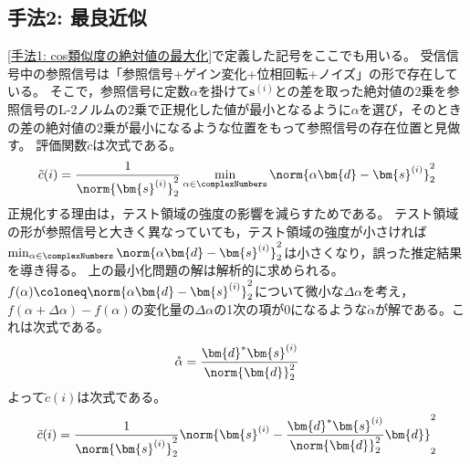         \subsection{手法2: 最良近似}
            \ref{手法1: cos類似度の絶対値の最大化}で定義した記号をここでも用いる。
            受信信号中の参照信号は「参照信号+ゲイン変化+位相回転+ノイズ」の形で存在している。
            そこで，参照信号に定数$\alpha$を掛けて$\bm{s}^{(i)}$との差を取った絶対値の2乗を参照信号のL-2ノルムの2乗で正規化した値が最小となるように$\alpha$を選び，そのときの差の絶対値の2乗が最小になるような位置をもって参照信号の存在位置と見做す。
            評価関数$\tilde{c}$は次式である。
            \[ \tilde{c}(i) = \frac{1}{\norm{\bm{s}^{(i)}}_2^2}\min_{\alpha \in \complexNumbers}\norm{\alpha\bm{d} - \bm{s}^{(i)}}_2^2 \]
            正規化する理由は，テスト領域の強度の影響を減らすためである。
            テスト領域の形が参照信号と大きく異なっていても，テスト領域の強度が小さければ$\min_{\alpha \in \complexNumbers}\norm{\alpha\bm{d} - \bm{s}^{(i)}}_2^2$は小さくなり，誤った推定結果を導き得る。
            上の最小化問題の解は解析的に求められる。
            $f(\alpha) \coloneq \norm{\alpha\bm{d} - \bm{s}^{(i)}}_2^2$について微小な$\Delta\alpha$を考え，$f(\alpha+\Delta\alpha) - f(\alpha)$の変化量の$\Delta\alpha$の1次の項が0になるような$\mathring{\alpha}$が解である。これは次式である。
            \[
                \mathring{\alpha} = \frac{\bm{d}^*\bm{s}^{(i)}}{\norm{\bm{d}}_2^2}
            \]
            よって$\tilde{c}(i)$は次式である。
            \[ \tilde{c}(i) = \frac{1}{\norm{\bm{s}^{(i)}}_2^2}\norm{\bm{s}^{(i)} - \frac{\bm{d}^*\bm{s}^{(i)}}{\norm{\bm{d}}_2^2}\bm{d}}_2^2 \]
